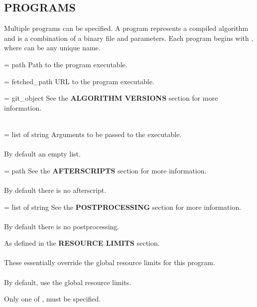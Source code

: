 \documentclass[a4paper,english]{article}
\begin{document}
\begin{adjustwidth}{18pt}{0pt}
    \section{PROGRAMS}

        Multiple programs can be specified.
        A program represents a compiled algorithm and is a combination of a binary file and parameters.
        Each program begins with , where  can be any unique name.

        \begin{Description}[Options]\setlength{\itemsep}{0cm}
            \item[\Opt{binary} = path]
              Path to the program executable.
            \item[\Opt{fetch} = fetched\_path]
              URL to the program executable.
            \item[\Opt{git} = git\_object]
              See the \textbf{ALGORITHM VERSIONS} section for more information. \\ \\
            \item[\Opt{arguments?} = list of string]
              Arguments to be passed to the executable. \\ \\
              By default an empty list.
            \item[\Opt{afterscript?} = path]
              See the \textbf{AFTERSCRIPTS} section for more information. \\ \\
              By default there is no afterscript.
            \item[\Opt{next?} = list of string]
              See the \textbf{POSTPROCESSING} section for more information. \\ \\
              By default there is no postprocessing.
            \item[\Opt{resource\_limits?}]
              As defined in the \textbf{RESOURCE LIMITS} section. \\ \\
              These essentially override the global resource limits for
              this program. \\ \\
              By default, use the global resource limits.
        \end{Description}

        Only one of ,  must be specified.


\end{adjustwidth}
\end{document}
